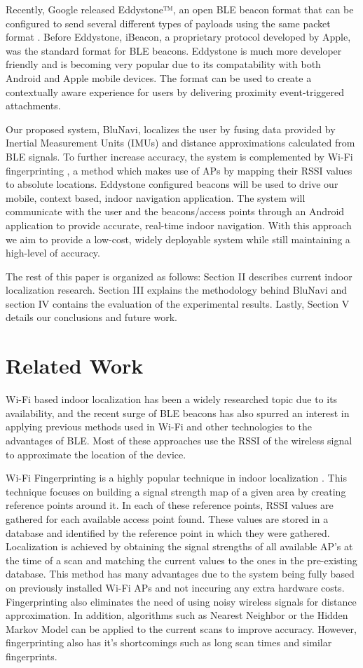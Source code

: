 \documentclass[conference]{IEEEtran}
\begin{document}
Recently, Google released Eddystone™, an open BLE beacon format that can be configured to send several different types of payloads using the same packet format \cite{Eddystone}. Before Eddystone, iBeacon, a proprietary protocol developed by Apple, was the standard format for BLE beacons. Eddystone is much more developer friendly and is becoming very popular due to its compatability with both Android and Apple mobile devices. The format can be used to create a contextually aware experience for users by delivering proximity event-triggered attachments.

Our proposed system, BluNavi, localizes the user by fusing data provided by Inertial Measurement Units (IMUs) and distance approximations calculated from BLE signals. To further increase accuracy, the system is complemented by Wi-Fi fingerprinting , a method which makes use of APs by mapping their RSSI values to absolute locations. Eddystone configured beacons will be used to drive our mobile, context based, indoor navigation application. The system will communicate with the user and the beacons/access points through an Android application to provide accurate, real-time indoor navigation. With this approach we aim to provide a low-cost, widely deployable system while still maintaining  a high-level of accuracy.

The rest of this paper is organized as follows: Section II describes current indoor localization research. Section III explains the methodology behind BluNavi and section IV contains the evaluation of the experimental results. Lastly, Section V details our conclusions and future work.


\section{Related Work}
Wi-Fi based indoor localization has been a widely researched topic due to its availability, and the recent surge of BLE beacons has also spurred an interest in applying previous methods used in Wi-Fi and other technologies to the advantages of BLE. Most of these approaches use the RSSI of the wireless signal to approximate the location of the device.

Wi-Fi Fingerprinting is a highly popular technique in indoor localization \cite{chan2012indoor,navarro2010wi}. This technique focuses on  building a signal strength map of a given area by creating reference points around it. In each of these reference points, RSSI values are gathered for each available access point found. These values are stored in a database and identified by the reference point in which they were gathered. Localization is achieved by obtaining the signal strengths of all available AP’s at the time of a scan and matching the current values to the ones in the pre-existing database. This method has many advantages due to the system being fully based on previously installed Wi-Fi APs and not inccuring any extra hardware costs. Fingerprinting also eliminates the need of using noisy wireless signals for distance approximation. In addition, algorithms such as Nearest Neighbor or the Hidden Markov Model can be applied to the current scans to improve accuracy. However, fingerprinting also has it’s shortcomings such as long scan times and similar fingerprints.
\end{document}
